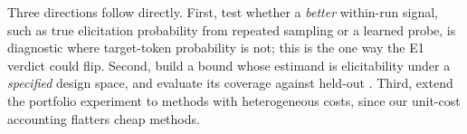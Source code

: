  Three directions follow directly. First, test whether a \emph{better} within-run
signal, such as true elicitation probability from repeated sampling or a learned probe, is
diagnostic where target-token probability is not; this is the one way the E1 verdict could flip.
Second, build a bound whose estimand is elicitability under a \emph{specified} design space, and
evaluate its coverage against held-out \families. Third, extend the portfolio experiment to methods
with heterogeneous costs, since our unit-cost accounting flatters cheap methods.
